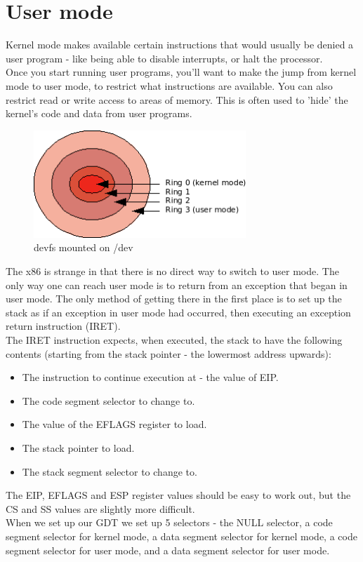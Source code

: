 \documentclass[12pt]{article}
\begin{document}
\section{User mode}
Kernel mode makes available certain instructions that would usually be denied a user program - like being able to disable interrupts, or halt the processor.\\
Once you start running user programs, you'll want to make the jump from kernel mode to user mode, to restrict what instructions are available. You can also restrict read or write access to areas of memory. This is often used to 'hide' the kernel's code and data from user programs.
\begin{figure}[H]
  \centering
  \includegraphics[width=8cm]{images/rings.png}
  \caption{devfs mounted on /dev}
\end{figure}
The x86 is strange in that there is no direct way to switch to user mode. The only way one can reach user mode is to return from an exception that began in user mode. The only method of getting there in the first place is to set up the stack as if an exception in user mode had occurred, then executing an exception return instruction (IRET).\\
The IRET instruction expects, when executed, the stack to have the following contents (starting from the stack pointer - the lowermost address upwards):
\begin{itemize}
  \item The instruction to continue execution at - the value of EIP.
  \item The code segment selector to change to.
  \item The value of the EFLAGS register to load.
  \item The stack pointer to load.
  \item The stack segment selector to change to.
\end{itemize}

The EIP, EFLAGS and ESP register values should be easy to work out, but the CS and SS values are slightly more difficult.\\
When we set up our GDT we set up 5 selectors - the NULL selector, a code segment selector for kernel mode, a data segment selector for kernel mode, a code segment selector for user mode, and a data segment selector for user mode.
\end{document}
